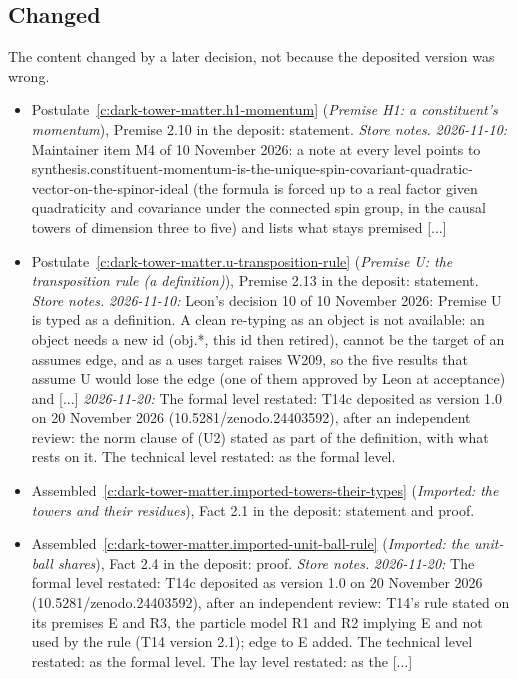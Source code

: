 \documentclass[11pt]{article}
\theoremstyle{definition}
\theoremstyle{plain}
\begin{document}
\subsection*{Changed}
The content changed by a later decision, not because the deposited version was wrong.
\begin{itemize}\setlength{\itemsep}{2pt}
\item Postulate~\ref{c:dark-tower-matter.h1-momentum} (\emph{Premise H1: a constituent's momentum}), Premise 2.10 in the deposit: statement. \emph{Store notes.} \emph{2026-11-10:} Maintainer item M4 of 10 November 2026: a note at every level points to synthesis.constituent-momentum-is-the-unique-spin-covariant-quadratic-vector-on-the-spinor-ideal (the formula is forced up to a real factor given quadraticity and covariance under the connected spin group, in the causal towers of dimension three to five) and lists what stays premised [...]
\item Postulate~\ref{c:dark-tower-matter.u-transposition-rule} (\emph{Premise U: the transposition rule (a definition)}), Premise 2.13 in the deposit: statement. \emph{Store notes.} \emph{2026-11-10:} Leon's decision 10 of 10 November 2026: Premise U is typed as a definition. A clean re-typing as an object is not available: an object needs a new id (obj.*, this id then retired), cannot be the target of an assumes edge, and as a uses target raises W209, so the five results that assume U would lose the edge (one of them approved by Leon at acceptance) and [...] \emph{2026-11-20:} The formal level restated: T14c deposited as version 1.0 on 20 November 2026 (10.5281/zenodo.24403592), after an independent review: the norm clause of (U2) stated as part of the definition, with what rests on it. The technical level restated: as the formal level.
\item Assembled~\ref{c:dark-tower-matter.imported-towers-their-types} (\emph{Imported: the towers and their residues}), Fact 2.1 in the deposit: statement and proof.
\item Assembled~\ref{c:dark-tower-matter.imported-unit-ball-rule} (\emph{Imported: the unit-ball shares}), Fact 2.4 in the deposit: proof. \emph{Store notes.} \emph{2026-11-20:} The formal level restated: T14c deposited as version 1.0 on 20 November 2026 (10.5281/zenodo.24403592), after an independent review: T14's rule stated on its premises E and R3, the particle model R1 and R2 implying E and not used by the rule (T14 version 2.1); edge to E added. The technical level restated: as the formal level. The lay level restated: as the [...]

\end{itemize}
\end{document}
